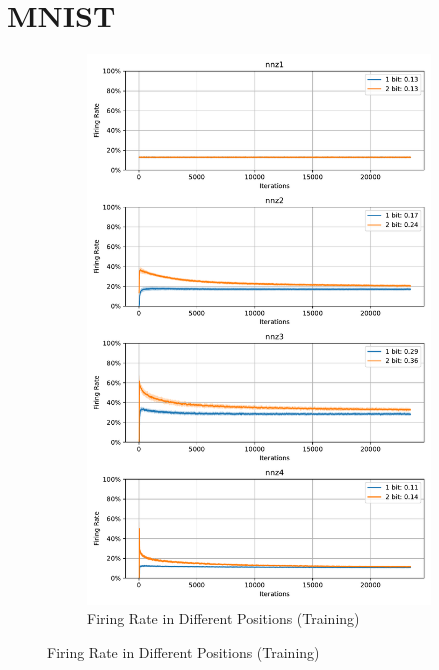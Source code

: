     \section{MNIST}
    \label{appendix:firerate_mnist}
        \begin{figure}[H]
            \centering
            \begin{subfigure}[H]{0.8\textwidth}
                \centering
                \includegraphics[width=\textwidth]{../firerate/MNIST/plots/mnist_train_firerate.pdf}
                \caption{Firing Rate in Different Positions (Training)}
            \end{subfigure}
        \end{figure}
